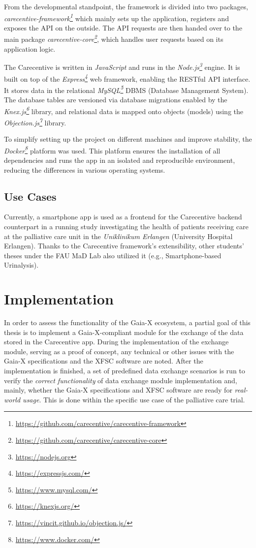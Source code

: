 From the developmental standpoint, the framework is divided into two packages, \textit{carecentive-framework\footnote{\url{https://github.com/carecentive/carecentive-framework}}} which mainly sets up the application, registers and exposes the API on the outside.
The API requests are then handed over to the main package \textit{carecentive-core\footnote{\url{https://github.com/carecentive/carecentive-core}}}, which handles user requests based on its application logic.

The Carecentive is written in \textit{JavaScript} and runs in the \textit{Node.js\footnote{\url{https://nodejs.org}}} engine.
It is built on top of the \textit{Express\footnote{\url{https://expressjs.com/}}} web framework, enabling the RESTful API interface.
It stores data in the relational \textit{MySQL\footnote{\url{https://www.mysql.com/}}} DBMS (Database Management System).
The database tables are versioned via database migrations enabled by the \textit{Knex.js\footnote{\url{https://knexjs.org/}}} library, and relational data is mapped onto objects (models) using the \textit{Objection.js\footnote{\url{https://vincit.github.io/objection.js/}}} library.

To simplify setting up the project on different machines and improve stability, the \textit{Docker\footnote{\url{https://www.docker.com/}}} platform was used.
This platform ensures the installation of all dependencies and runs the app in an isolated and reproducible environment, reducing the differences in various operating systems.

\subsection{Use Cases}\label{subsec:use-cases}

Currently, a smartphone app is used as a frontend for the Carecentive backend counterpart in a running study investigating the health of patients receiving care at the palliative care unit in the \textit{Uniklinikum Erlangen} (University Hospital Erlangen).
Thanks to the Carecentive framework's extensibility, other students' theses under the FAU MaD Lab also utilized it (e.g., Smartphone-based Urinalysis).

\section{Implementation}\label{sec:implementation}

In order to assess the functionality of the Gaia-X ecosystem, a partial goal of this thesis is to implement a Gaia-X-compliant module for the exchange of the data stored in the Carecentive app.
During the implementation of the exchange module, serving as a proof of concept, any technical or other issues with the Gaia-X specifications and the XFSC software are noted.
After the implementation is finished, a set of predefined data exchange scenarios is run to verify the \textit{correct functionality} of data exchange module implementation and, mainly, whether the Gaia-X specifications and XFSC software are ready for \textit{real-world usage}.
This is done within the specific use case of the palliative care trial.


